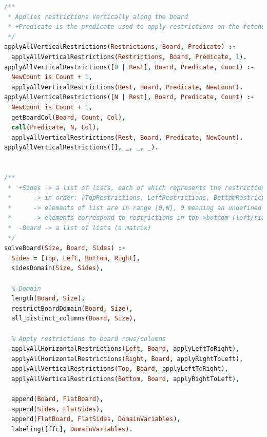 \documentclass{llncs}
\begin{document}
\begin{lstlisting}[language=Prolog]
/**
 * Applies restrictions Vertically along the board
 * +Predicate is the predicate used to apply restrictions on the fetched Column.
 */
applyAllVerticalRestrictions(Restrictions, Board, Predicate) :-
  applyAllVerticalRestrictions(Restrictions, Board, Predicate, 1).
applyAllVerticalRestrictions([0 | Rest], Board, Predicate, Count) :-
  NewCount is Count + 1,
  applyAllVerticalRestrictions(Rest, Board, Predicate, NewCount).
applyAllVerticalRestrictions([N | Rest], Board, Predicate, Count) :-
  NewCount is Count + 1,
  getBoardCol(Board, Count, Col),
  call(Predicate, N, Col),
  applyAllVerticalRestrictions(Rest, Board, Predicate, NewCount).
applyAllVerticalRestrictions([], _, _, _).


/**
 *  +Sides -> a list of lists, each of which represents the restrictions on the side of the board (number of visible buildings).
 *      -> in order: [TopRestrictions, LeftRestrictions, BottomRestrictions, RightRestrictions]
 *      -> elements of list are in range [0,N], 0 meaning an undefined restriction
 *      -> elements correspond to restrictions in top->bottom (left/right lists) or left->right (top/bottom lists) order
 *  -Board -> a list of lists (a matrix)
 */
solveBoard(Size, Board, Sides) :-
  Sides = [Top, Left, Bottom, Right],
  sidesDomain(Size, Sides),

  % Domain
  length(Board, Size),
  restrictBoardDomain(Board, Size),
  all_distinct_columns(Board, Size),

  % Apply restrictions to board rows/columns
  applyAllHorizontalRestrictions(Left, Board, applyLeftToRight),
  applyAllHorizontalRestrictions(Right, Board, applyRightToLeft),
  applyAllVerticalRestrictions(Top, Board, applyLeftToRight),
  applyAllVerticalRestrictions(Bottom, Board, applyRightToLeft),

  append(Board, FlatBoard),
  append(Sides, FlatSides),
  append(FlatBoard, FlatSides, DomainVariables),
  labeling([ffc], DomainVariables).

\end{lstlisting}
\newpage
\end{document}
